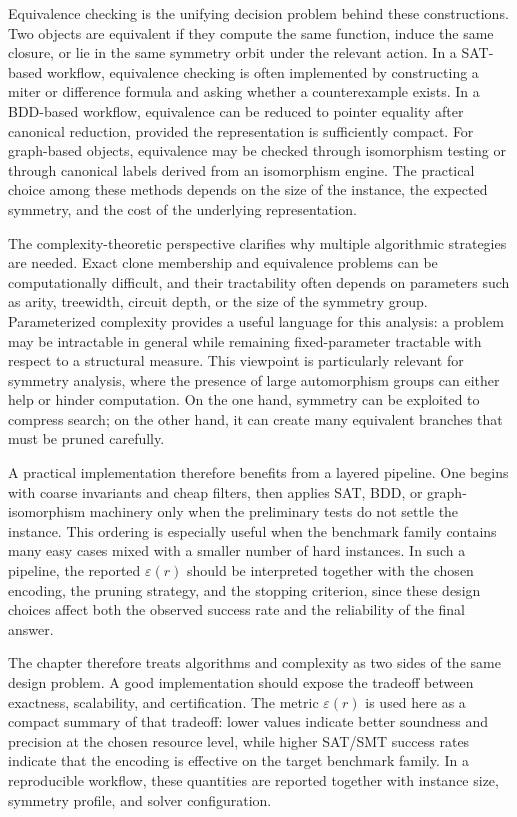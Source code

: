 \documentclass[11pt]{article}
\begin{document}
Equivalence checking is the unifying decision problem behind these constructions. Two objects are equivalent if they compute the same function, induce the same closure, or lie in the same symmetry orbit under the relevant action. In a SAT-based workflow, equivalence checking is often implemented by constructing a miter or difference formula and asking whether a counterexample exists. In a BDD-based workflow, equivalence can be reduced to pointer equality after canonical reduction, provided the representation is sufficiently compact. For graph-based objects, equivalence may be checked through isomorphism testing or through canonical labels derived from an isomorphism engine. The practical choice among these methods depends on the size of the instance, the expected symmetry, and the cost of the underlying representation.

The complexity-theoretic perspective clarifies why multiple algorithmic strategies are needed. Exact clone membership and equivalence problems can be computationally difficult, and their tractability often depends on parameters such as arity, treewidth, circuit depth, or the size of the symmetry group. Parameterized complexity provides a useful language for this analysis: a problem may be intractable in general while remaining fixed-parameter tractable with respect to a structural measure. This viewpoint is particularly relevant for symmetry analysis, where the presence of large automorphism groups can either help or hinder computation. On the one hand, symmetry can be exploited to compress search; on the other hand, it can create many equivalent branches that must be pruned carefully.

A practical implementation therefore benefits from a layered pipeline. One begins with coarse invariants and cheap filters, then applies SAT, BDD, or graph-isomorphism machinery only when the preliminary tests do not settle the instance. This ordering is especially useful when the benchmark family contains many easy cases mixed with a smaller number of hard instances. In such a pipeline, the reported \(\varepsilon(r)\) should be interpreted together with the chosen encoding, the pruning strategy, and the stopping criterion, since these design choices affect both the observed success rate and the reliability of the final answer.

The chapter therefore treats algorithms and complexity as two sides of the same design problem. A good implementation should expose the tradeoff between exactness, scalability, and certification. The metric \(\varepsilon(r)\) is used here as a compact summary of that tradeoff: lower values indicate better soundness and precision at the chosen resource level, while higher SAT/SMT success rates indicate that the encoding is effective on the target benchmark family. In a reproducible workflow, these quantities are reported together with instance size, symmetry profile, and solver configuration.
\end{document}
